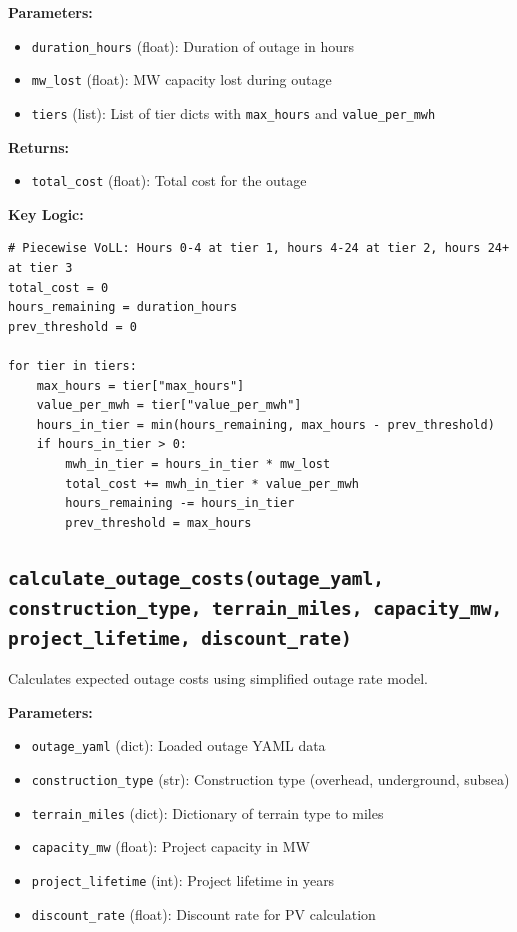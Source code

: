 \documentclass[12pt]{article}
\begin{document}
\textbf{Parameters:}
\begin{itemize}
    \item \texttt{duration\_hours} (float): Duration of outage in hours
    \item \texttt{mw\_lost} (float): MW capacity lost during outage
    \item \texttt{tiers} (list): List of tier dicts with \texttt{max\_hours} and \texttt{value\_per\_mwh}
\end{itemize}

\textbf{Returns:}
\begin{itemize}
    \item \texttt{total\_cost} (float): Total cost for the outage
\end{itemize}

\textbf{Key Logic:}
\begin{lstlisting}
# Piecewise VoLL: Hours 0-4 at tier 1, hours 4-24 at tier 2, hours 24+ at tier 3
total_cost = 0
hours_remaining = duration_hours
prev_threshold = 0

for tier in tiers:
    max_hours = tier["max_hours"]
    value_per_mwh = tier["value_per_mwh"]
    hours_in_tier = min(hours_remaining, max_hours - prev_threshold)
    if hours_in_tier > 0:
        mwh_in_tier = hours_in_tier * mw_lost
        total_cost += mwh_in_tier * value_per_mwh
        hours_remaining -= hours_in_tier
        prev_threshold = max_hours
\end{lstlisting}

\subsection{\texttt{calculate\_outage\_costs(outage\_yaml, construction\_type, terrain\_miles, capacity\_mw, project\_lifetime, discount\_rate)}}

Calculates expected outage costs using simplified outage rate model.

\textbf{Parameters:}
\begin{itemize}
    \item \texttt{outage\_yaml} (dict): Loaded outage YAML data
    \item \texttt{construction\_type} (str): Construction type (overhead, underground, subsea)
    \item \texttt{terrain\_miles} (dict): Dictionary of terrain type to miles
    \item \texttt{capacity\_mw} (float): Project capacity in MW
    \item \texttt{project\_lifetime} (int): Project lifetime in years
    \item \texttt{discount\_rate} (float): Discount rate for PV calculation
\end{itemize}
\end{document}

